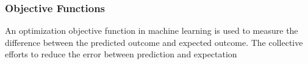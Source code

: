 \subsubsection{Objective Functions}
An optimization objective function in machine learning is used to measure the difference between the predicted outcome and expected outcome. The collective efforts to reduce the error between prediction and expectation 